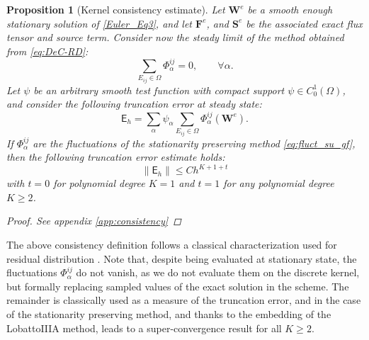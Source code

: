 \documentclass[a4paper,10pt]{article}
\newtheorem{proposition}[theorem]{Proposition}
\begin{document}
\begin{proposition}[Kernel consistency  estimate]\label{prop:consistency_equilibria} Let $\mathbf{W}^e$ be  a smooth enough stationary solution of \eqref{Euler_Eq3}, and let  $\mathbf{F}^e$, and 
$\mathbf{S}^e$ be  the associated  exact flux tensor and source term.  Consider now the steady limit of the   method obtained from \eqref{eq:DeC-RD}:
$$
\sum_{E_{ij}\in\Omega}\Phi_{\alpha}^{ij}=0 ,\qquad \forall \alpha.
$$
Let $\psi$ be an arbitrary smooth test function with compact support  $\psi \in C^1_0(\Omega)$, and consider the following truncation error at steady state:
\begin{equation}\label{eq:TE0}
\mathsf{E}_h = \sum_{\alpha}\psi_\alpha \sum_{E_{ij}\in\Omega}\Phi_{\alpha}^{ij}(\mathbf{W}^e).
\end{equation}
If  $\Phi_{\alpha}^{ij}$ are  the fluctuations of the stationarity preserving method   \eqref{eq:fluct_su_gf}, then the following truncation error estimate holds:
\begin{equation}
\|\mathsf{E}_h\| \le C h^{K+1+t}  
\end{equation}
with $t=0$ for polynomial degree $K=1$ and $t=1$ for any polynomial degree $K\ge 2$.
\begin{proof}
See appendix \ref{app:consistency}
\end{proof}
\end{proposition}
The above consistency definition follows a classical  characterization used for residual distribution \cite{RD-ency,AR:17,amr2025}. Note that, despite being evaluated at stationary state,
the fluctuations $\Phi_{\alpha}^{ij}$ do not vanish, as we do not evaluate them on the discrete kernel, but formally replacing sampled values of the exact solution in the scheme.
The remainder is   classically used as a measure of the truncation error, and in the case of the stationarity preserving method, and thanks to the embedding of the LobattoIIIA method,
leads to a super-convergence result for all $K\ge 2$.
 
\end{document}
